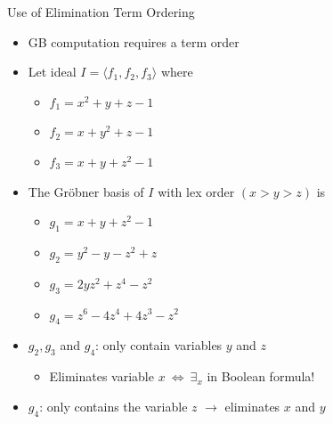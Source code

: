 \documentclass[xcolor=dvipsnames]{beamer}
\newcommand{\Grobner}{Gr\"{o}bner\xspace}
\begin{document}
\begin{frame}{\large {Use of Elimination Term Ordering}}
\begin{itemize}
\item GB computation requires a term order
\item Let ideal $I = \langle f_1, f_2, f_3 \rangle$ where
	\begin{itemize}
	\item $f_1 = x^2 + y + z - 1$
	\item $f_2 = x + y^2 + z - 1$
	\item $f_3 = x + y + z^2 - 1$
	\end{itemize}
\item The \Grobner basis of $I$ with lex order $(x > y > z)$ is
	\begin{itemize}
	\item $g_1 = x + y + z^2 - 1$
	\item $g_2 = y^2 - y - z^2 + z$
	\item $g_3 = 2yz^2 + z^4 - z^2$
	\item $g_4 = z^6 - 4z^4 + 4z^3 - z^2$
	\end{itemize}
\item $g_2,g_3$ and $g_4$: only contain variables $y$ and $z$
	\begin{itemize}
	\item Eliminates variable $x~\Leftrightarrow  ~\exists_x$ in Boolean formula!
	\end{itemize}
\item $g_4$: only contains the variable $z$ $\to$ eliminates $x$ and $y$
\end{itemize}
\end{frame}

\end{document}
